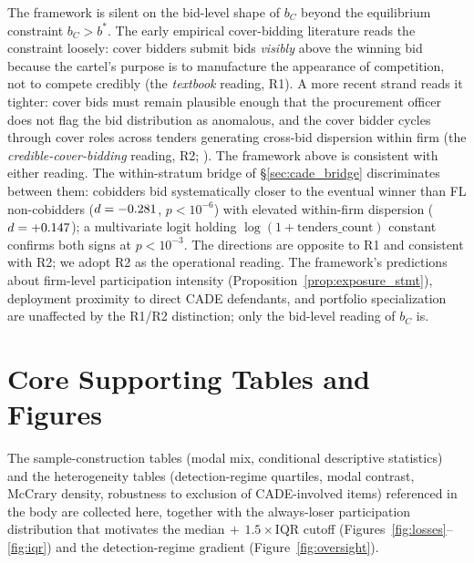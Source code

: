 The framework is silent on the bid-level shape of $b_C$ beyond
the equilibrium constraint $b_C > b^*$. The early empirical
cover-bidding literature
\citep{porter1993detection,porter1999ohio,bajari2003deciding}
reads the constraint loosely: cover bidders submit bids
\emph{visibly} above the winning bid because the cartel's purpose
is to manufacture the appearance of competition, not to compete
credibly (the \emph{textbook} reading, R1). A more recent strand
reads it tighter: cover bids must remain plausible enough that
the procurement officer does not flag the bid distribution as
anomalous, and the cover bidder cycles through cover roles
across tenders generating cross-bid dispersion within firm
(the \emph{credible-cover-bidding} reading, R2;
\citealt{marshall2012economics,asker2010leniency}). The framework
above is consistent with either reading. The within-stratum
bridge of \S\ref{sec:cade_bridge} discriminates between them:
cobidders bid systematically closer to the eventual winner than
FL non-cobidders ($d=-0.281$, $p<10^{-6}$) with
elevated within-firm dispersion ($d=+0.147$); a
multivariate logit holding $\log(1+\text{tenders\_count})$
constant confirms both signs at $p<10^{-3}$. The directions are
opposite to R1 and consistent with R2; we adopt R2 as the
operational reading. The framework's predictions about firm-level
participation intensity (Proposition~\ref{prop:exposure_stmt}),
deployment proximity to direct CADE defendants, and portfolio
specialization are unaffected by the R1/R2 distinction; only the
bid-level reading of $b_C$ is.

\section{Core Supporting Tables and Figures}
\label{app:supporting}

The sample-construction tables (modal mix, conditional
descriptive statistics) and the heterogeneity tables
(detection-regime quartiles, modal contrast, McCrary density,
robustness to exclusion of CADE-involved items) referenced in
the body are collected here, together with the always-loser
participation distribution that motivates the
median$\,+\,1.5\!\times\!$IQR cutoff
(Figures~\ref{fig:losses}--\ref{fig:iqr}) and the
detection-regime gradient (Figure~\ref{fig:oversight}).







